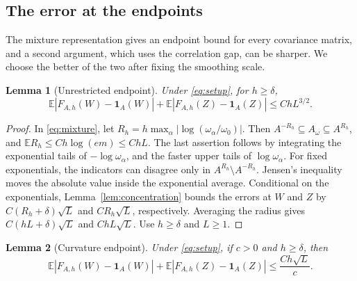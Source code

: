 \documentclass[11pt,letterpaper]{article}
\newif\ifshowrev
\newcommand{\rev}[1]{\ifshowrev{\color{revblue}%
\hypersetup{linkcolor=revblue,citecolor=revblue,urlcolor=revblue}#1}\else#1\fi}
\newcommand{\rs}[1]{\ifshowrev{\color{revblue}#1}\else#1\fi}
\newif\ifshowtrim
\newcommand{\trim}[1]{\ifshowtrim{\color{revblue}%
\hypersetup{linkcolor=revblue,citecolor=revblue,urlcolor=revblue}#1}\else#1\fi}
\newtheorem{lemma}{Lemma}
\theoremstyle{remark}
\newcommand{\E}{\mathbb E}
\newcommand{\ind}{\mathbf 1}
\begin{document}
\subsection{The error at the endpoints}

\rev{The mixture representation gives an endpoint bound for every
covariance matrix, and a second argument, which uses the correlation
gap, can be sharper. We choose the better of the two after fixing the
smoothing scale.}

\begin{lemma}[Unrestricted endpoint]\label{appx-lem:endpoint-free}
Under \eqref{eq:setup}, for \(h\ge\delta\),
\begin{equation}
 \E|F_{A,h}(W)-\ind_A(W)|
 +\E|F_{A,h}(Z)-\ind_A(Z)|
 \le ChL^{3/2}.
 \label{appx-eq:endpoint-free}
\end{equation}
\end{lemma}

\begin{proof}
In \trim{\eqref{eq:mixture}}, let
\(R_h=h\max_\alpha|\log(\rs{\omega_\alpha}/\rs{\omega_0})|\).
Then \(A^{-R_h}\subseteq A_{\rs\omega}\subseteq A^{R_h}\), and
\(\E R_h\le Ch\log(em)\le ChL\).
The last assertion follows by integrating the exponential tails of
\(-\log\rs{\omega_\alpha}\), and the faster upper tails of \(\log\rs{\omega_\alpha}\).
For fixed exponentials, the indicators can disagree only in
\(A^{R_h}\setminus A^{-R_h}\). Jensen's inequality moves the absolute
value inside the exponential average. Conditional on the exponentials,
Lemma~\rev{\ref{lem:concentration}} bounds the errors at \(W\) and \(Z\)
by \(C(R_h+\delta)\sqrt L\) and \(CR_h\sqrt L\), respectively.
Averaging the radius gives \(C(hL+\delta)\sqrt L\) and
\(ChL\sqrt L\).
Use \(h\ge\delta\) and \(L\ge1\).
\end{proof}

\begin{lemma}[Curvature endpoint]\label{appx-lem:endpoint-gap}
Under \eqref{eq:setup}, if \(c>0\) and \(h\ge\delta\), then
\begin{equation}
 \E|F_{A,h}(W)-\ind_A(W)|
 +\E|F_{A,h}(Z)-\ind_A(Z)|
 \le \frac{Ch\sqrt L}{c}.
 \label{appx-eq:endpoint-gap}
\end{equation}
\end{lemma}
\end{document}
